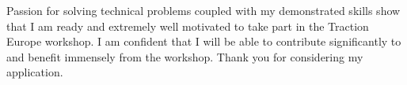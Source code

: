 Passion for solving technical problems coupled with my demonstrated skills show that I am ready and extremely well motivated to take part in the Traction Europe workshop. I am confident that I will be able to contribute significantly to and benefit immensely from the workshop. Thank you for considering my application.

